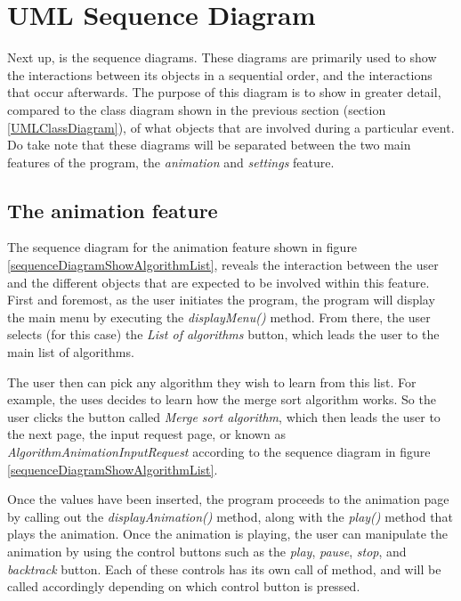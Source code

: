 \newpage

\section{UML Sequence Diagram}

Next up, is the sequence diagrams. These diagrams are primarily used to show the interactions between its objects in a sequential order, and the interactions that occur afterwards. The purpose of this diagram is to show in greater detail, compared to the class diagram shown in the previous section (section \ref{UMLClassDiagram}), of what objects that are involved during a particular event. Do take note that these diagrams will be separated between the two main features of the program, the \textit{animation} and \textit{settings} feature.


\subsection{The animation feature}
The sequence diagram for the animation feature shown in figure \ref{sequenceDiagramShowAlgorithmList}, reveals the interaction between the user and the different objects that are expected to be involved within this feature. First and foremost, as the user initiates the program, the program will display the main menu by executing the \textit{displayMenu()} method. From there, the user selects (for this case) the \textit{List of algorithms} button, which leads the user to the main list of algorithms.

The user then can pick any algorithm they wish to learn from this list. For example, the uses decides to learn how the merge sort algorithm works. So the user clicks the button called \textit{Merge sort algorithm}, which then leads the user to the next page, the input request page, or known as \textit{AlgorithmAnimationInputRequest} according to the sequence diagram in figure \ref{sequenceDiagramShowAlgorithmList}.

Once the values have been inserted, the program proceeds to the animation page by calling out the \textit{displayAnimation()} method, along with the \textit{play()} method that plays the animation. Once the animation is playing, the user can manipulate the animation by using the control buttons such as the \textit{play}, \textit{pause}, \textit{stop}, and \textit{backtrack} button. Each of these controls has its own call of method, and will be called accordingly depending on which control button is pressed. 


